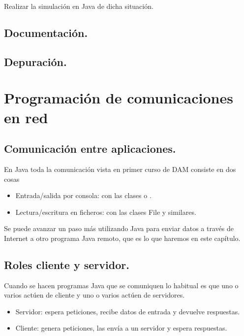 \documentclass[a4paper,12pt,spanish]{sphinxmanual}
\begin{document}
Realizar la simulación en Java de dicha situación.


\section{Documentación.}
\label{textos/tema2:documentacion}

\section{Depuración.}
\label{textos/tema2:depuracion}

\chapter{{}Programación de comunicaciones en red}
\label{textos/tema3:programacion-de-comunicaciones-en-red}\label{textos/tema3::doc}

\section{Comunicación entre aplicaciones.}
\label{textos/tema3:comunicacion-entre-aplicaciones}
En Java toda la comunicación vista en primer curso de DAM consiste en dos cosas
\begin{itemize}
\item {} 
Entrada/salida por consola: con las clases  o .

\item {} 
Lectura/escritura en ficheros: con las clases File y similares.

\end{itemize}

Se puede avanzar un paso más utilizando Java para enviar datos a través de Internet a otro programa Java remoto, que es lo que haremos en este capítulo.


\section{Roles cliente y servidor.}
\label{textos/tema3:roles-cliente-y-servidor}
Cuando se hacen programas Java que se comuniquen lo habitual es que uno o varios actúen de cliente y uno o varios actúen de servidores.
\begin{itemize}
\item {} 
Servidor: espera peticiones, recibe datos de entrada y devuelve respuestas.

\item {} 
Cliente: genera peticiones, las envía a un servidor y espera respuestas.

\end{itemize}
\end{document}
